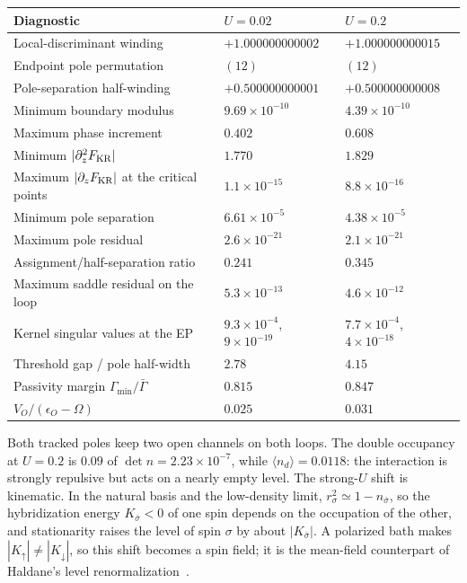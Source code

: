 \documentclass[%
  aps,physrev,onecolumn,10pt,amsmath,amssymb,superscriptaddress,longbibliography,floatfix
]{revtex4-2}
\begin{document}
\begin{center}
\begin{tabular}{@{}lll@{}}
\toprule
Diagnostic & $U=0.02$ & $U=0.2$\\
\midrule
Local-discriminant winding & $+1.000000000002$ & $+1.000000000015$\\
Endpoint pole permutation & $(12)$ & $(12)$\\
Pole-separation half-winding & $+0.500000000001$ & $+0.500000000008$\\
Minimum boundary modulus & $9.69\times10^{-10}$ & $4.39\times10^{-10}$\\
Maximum phase increment & $0.402$ & $0.608$\\
Minimum $|\partial_z^2F_{\rm KR}|$ & $1.770$ & $1.829$\\
Maximum $|\partial_zF_{\rm KR}|$ at the critical points & $1.1\times10^{-15}$ & $8.8\times10^{-16}$\\
Minimum pole separation & $6.61\times10^{-5}$ & $4.38\times10^{-5}$\\
Maximum pole residual & $2.6\times10^{-21}$ & $2.1\times10^{-21}$\\
Assignment/half-separation ratio & $0.241$ & $0.345$\\
Maximum saddle residual on the loop & $5.3\times10^{-13}$ & $4.6\times10^{-12}$\\
Kernel singular values at the EP & $9.3\times10^{-4}$, $9\times10^{-19}$ & $7.7\times10^{-4}$, $4\times10^{-18}$\\
Threshold gap / pole half-width & $2.78$ & $4.15$\\
Passivity margin $\Gamma_{\min}/\bar\Gamma$ & $0.815$ & $0.847$\\
$V_O/(\epsilon_O-\Omega)$ & $0.025$ & $0.031$\\
\bottomrule
\end{tabular}
\end{center}
Both tracked poles keep two open channels on both loops.  The double
occupancy at $U=0.2$ is $0.09$ of $\det n=2.23\times10^{-7}$, while
$\langle n_d\rangle=0.0118$: the interaction is strongly repulsive but acts on a
nearly empty level.  The strong-$U$ shift is kinematic.  In the natural basis
and the low-density limit, $r_\sigma^2\simeq1-n_{\bar\sigma}$, so the
hybridization energy $K_{\bar\sigma}<0$ of one spin depends on the occupation
of the other, and stationarity raises the level of spin $\sigma$ by about
$|K_{\bar\sigma}|$.  A polarized bath makes $|K_\uparrow|\neq|K_\downarrow|$, so
this shift becomes a spin field; it is the mean-field counterpart of Haldane's
level renormalization~\cite{Haldane1978}.
\end{document}
